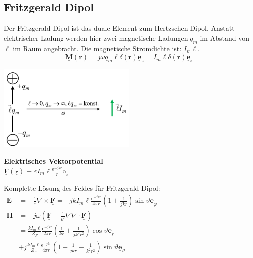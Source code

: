 \documentclass[english]{latex4ei/latex4ei_sheet}
\renewcommand{\vec}[1]{\underline{\boldsymbol{#1}}}
\begin{document}
\begin{sectionbox}

    \subsection{Fritzgerald Dipol}
    Der Fritzgerald Dipol ist das duale Element zum Hertzschen Dipol. Anstatt elektrischer Ladung werden hier zwei magnetische Ladungen $q_m$ im Abstand von $\ell$ im Raum angebracht.
    Die magnetische Stromdichte ist: $I_m \ell$.
    $$
        \vec{M}(\vec{r})=j \omega q_{m} \ell \delta(\vec{r}) \vec{e}_{z}=I_{m} \ell \delta(\vec{r}) \vec{e}_{z}
    $$
    \begin{center}
        \includegraphics[width=0.5\textwidth]{./img/antennen_fritz_gerald_dipol.png}
    \end{center}

    \begin{emphbox}
        \begin{flushleft}
            \textbf{Elektrisches Vektorpotential}\\
            $\vec{F}(\vec{r})=\varepsilon I_{m} \ell \frac{\mathrm{e}^{-j k r}}{r} \vec{e}_{z}$
        \end{flushleft}
    \end{emphbox}
    Komplette Lösung des Feldes für Fritzgerald Dipol:\\

    $\begin{aligned} \vec{E} & =-\frac{1}{\varepsilon} \nabla \times \vec{F}=-j k I_{m} \ell \frac{\mathrm{e}^{-j k r}}{4 \pi r}\left(1+\frac{1}{j k r}\right) \sin \vartheta \vec{e}_{\varphi} \\ \vec{H} &=-j \omega\left(\vec{F}+\frac{1}{k^{2}} \nabla \nabla \cdot \vec{F}\right) \\ &=\frac{k I_{m} \ell}{Z_{F}} \frac{\mathrm{e}^{-j k r}}{2 \pi r}\left(\frac{1}{k r}+\frac{1}{j k^{2} r^{2}}\right) \cos \vartheta \vec{e}_{r}\\
                    & +j \frac{k I_{m} \ell}{Z_{F}} \frac{\mathrm{e}^{-j k r}}{4 \pi r}\left(1+\frac{1}{j k r}-\frac{1}{k^{2} r^{2}}\right) \sin \vartheta \vec{e}_{\vartheta}\end{aligned}$

\end{sectionbox}
\end{document}
